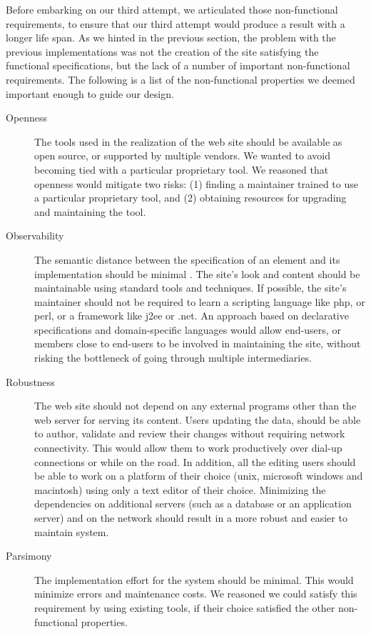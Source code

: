 \documentclass[10pt]{article}
\begin{document}
Before embarking on our third attempt,
we articulated those non-functional requirements, to ensure that our 
third attempt would produce
a result with a longer life span.
As we hinted in the previous section, the problem with
the previous implementations was not the creation of the site
satisfying the functional specifications,
but the lack of a number of important non-functional requirements.
The following is a list of the non-functional properties
we deemed important enough to guide our design.

\begin{description}
\item[Openness] The tools used in the realization of the web site
should be available as open source, or supported by multiple vendors.
We wanted to avoid becoming tied with a particular proprietary
tool.
We reasoned that openness would mitigate two risks:
(1) finding a maintainer trained to use a particular proprietary tool,
and (2) obtaining resources for upgrading and maintaining the tool.

\item[Observability]
The semantic distance between
the specification of an element and its implementation 
should be minimal \cite{SG97}.
The site's look and content should be maintainable
using standard tools and techniques.
If possible, the site's maintainer should not be required to
learn a scripting language like {\sc php}, or {\sc perl}, or
a framework like {\sc j2ee} or {\sc .net}.
An approach based on declarative specifications \cite{FFLS00} and
domain-specific languages \cite{DKV00, Spi00b} would allow end-users, or members
close to end-users to be involved in maintaining the site,
without risking the bottleneck of going through
multiple intermediaries.

\item[Robustness] The web site should not depend on
any external programs other than the web server for serving
its content.
Users updating the data, should be able to author, validate and 
review their changes without requiring network connectivity.
This would allow them to work productively over dial-up connections
or while on the road. In addition, all the editing users should be able 
to work on a platform of their choice ({\sc unix}, {\sc microsoft windows} and {\sc macintosh}) 
using only a text editor of their choice.
Minimizing the dependencies on additional servers (such as a
database or an application server) and on the network
should result in a more robust and easier to maintain system.   

\item[Parsimony] The implementation effort for
the system should be minimal.
This would minimize errors and maintenance costs.
We reasoned we could satisfy this requirement by
using existing tools, if their choice satisfied the
other non-functional properties.
\end{description} 
\end{document}

